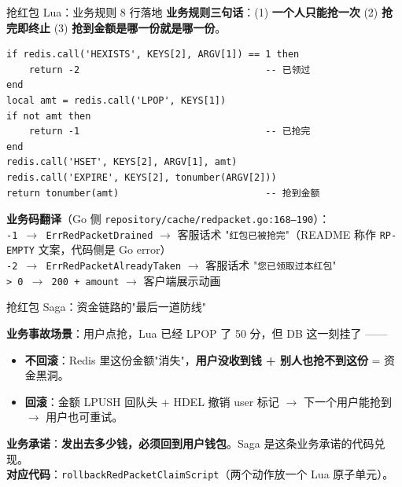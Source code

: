 \documentclass[aspectratio=169,11pt]{beamer}
\begin{document}
\begin{frame}{抢红包 Lua：业务规则 8 行落地}
\small \textbf{业务规则三句话}：(1) \textbf{一个人只能抢一次} (2) \textbf{抢完即终止} (3) \textbf{抢到金额是哪一份就是哪一份}。
\begin{lstlisting}[language=LuaRedis,firstnumber=52,
  caption={}]
if redis.call('HEXISTS', KEYS[2], ARGV[1]) == 1 then
    return -2                                 -- 已领过
end
local amt = redis.call('LPOP', KEYS[1])
if not amt then
    return -1                                 -- 已抢完
end
redis.call('HSET', KEYS[2], ARGV[1], amt)
redis.call('EXPIRE', KEYS[2], tonumber(ARGV[2]))
return tonumber(amt)                          -- 抢到金额
\end{lstlisting}
\vspace{-1mm}
\scriptsize \textbf{业务码翻译}（Go 侧 \texttt{repository/cache/redpacket.go:168--190}）：\\
\texttt{-1 $\to$ ErrRedPacketDrained} $\to$ 客服话术 "\texttt{红包已被抢完}"（README 称作 \texttt{RP-EMPTY} 文案，代码侧是 Go error）\\
\texttt{-2 $\to$ ErrRedPacketAlreadyTaken} $\to$ 客服话术 "\texttt{您已领取过本红包}"\\
\texttt{> 0 $\to$ 200 + amount} $\to$ 客户端展示动画
\end{frame}

\begin{frame}[shrink]{抢红包 Saga：资金链路的"最后一道防线"}
\vspace{2mm}
\small \textbf{业务事故场景}：用户点抢，Lua 已经 LPOP 了 50 分，但 DB 这一刻挂了 ——
\begin{itemize}\itemsep0pt
  \item \textbf{不回滚}：Redis 里这份金额"消失"，\textbf{用户没收到钱 + 别人也抢不到这份} = 资金黑洞。
  \item \textbf{回滚}：金额 LPUSH 回队头 + HDEL 撤销 user 标记 $\to$ 下一个用户能抢到 $\to$ 用户也可重试。
\end{itemize}
\textbf{业务承诺}：\textbf{发出去多少钱，必须回到用户钱包}。Saga 是这条业务承诺的代码兑现。\\
\textbf{对应代码}：\texttt{rollbackRedPacketClaimScript}（两个动作放一个 Lua 原子单元）。
\end{frame}
\end{document}
